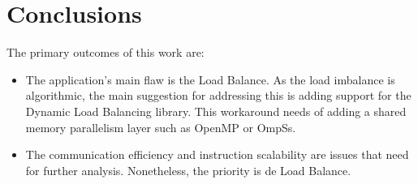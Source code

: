 \section{Conclusions}

The primary outcomes of this work are:

\begin{itemize}
  \item The application's main flaw is the Load Balance. As the load imbalance is algorithmic, the main suggestion for addressing this is adding support for the Dynamic Load Balancing library. This workaround needs of adding a shared memory parallelism layer such as OpenMP or OmpSs.
  \item The communication efficiency and instruction scalability are issues that need for further analysis. Nonetheless, the priority is de Load Balance. 
\end{itemize}
